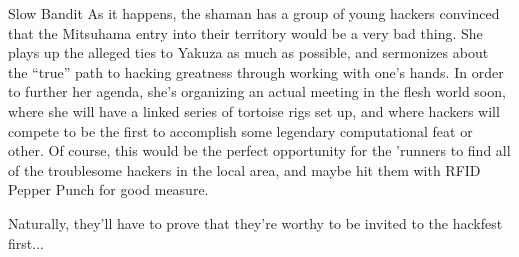 \begin{scenario}{Slow Bandit}
As it happens, the shaman has a group of young hackers convinced that the Mitsuhama entry into their territory would be a very bad thing. She plays up the alleged ties to Yakuza as much as possible, and sermonizes about the ``true'' path to hacking greatness through working with one's hands. In order to further her agenda, she's organizing an actual meeting in the flesh world soon, where she will have a linked series of tortoise rigs set up, and where hackers will compete to be the first to accomplish some legendary computational feat or other. Of course, this would be the perfect opportunity for the 'runners to find all of the troublesome hackers in the local area, and maybe hit them with RFID Pepper Punch for good measure.

Naturally, they'll have to prove that they're worthy to be invited to the hackfest first... 

\end{scenario}